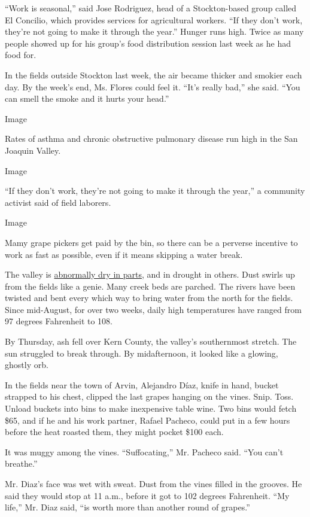 ``Work is seasonal,'' said Jose Rodriguez, head of a Stockton-based
group called El Concilio, which provides services for agricultural
workers. ``If they don't work, they're not going to make it through the
year.'' Hunger runs high. Twice as many people showed up for his group's
food distribution session last week as he had food for.

In the fields outside Stockton last week, the air became thicker and
smokier each day. By the week's end, Ms. Flores could feel it. ``It's
really bad,'' she said. ``You can smell the smoke and it hurts your
head.''

Image

Rates of asthma and chronic obstructive pulmonary disease run high in
the San Joaquin Valley.

Image

``If they don't work, they're not going to make it through the year,'' a
community activist said of field laborers.

Image

Mamy grape pickers get paid by the bin, so there can be a perverse
incentive to work as fast as possible, even if it means skipping a water
break.

The valley is
\href{https://droughtmonitor.unl.edu/CurrentMap/StateDroughtMonitor.aspx?CA}{abnormally
dry in parts,} and in drought in others. Dust swirls up from the fields
like a genie. Many creek beds are parched. The rivers have been twisted
and bent every which way to bring water from the north for the fields.
Since mid-August, for over two weeks, daily high temperatures have
ranged from 97 degrees Fahrenheit to 108.

By Thursday, ash fell over Kern County, the valley's southernmost
stretch. The sun struggled to break through. By midafternoon, it looked
like a glowing, ghostly orb.

In the fields near the town of Arvin, Alejandro Díaz, knife in hand,
bucket strapped to his chest, clipped the last grapes hanging on the
vines. Snip. Toss. Unload buckets into bins to make inexpensive table
wine. Two bins would fetch \$65, and if he and his work partner, Rafael
Pacheco, could put in a few hours before the heat roasted them, they
might pocket \$100 each.

It was muggy among the vines. ``Suffocating,'' Mr. Pacheco said. ``You
can't breathe.''

Mr. Diaz's face was wet with sweat. Dust from the vines filled in the
grooves. He said they would stop at 11 a.m., before it got to 102
degrees Fahrenheit. ``My life,'' Mr. Diaz said, ``is worth more than
another round of grapes.''

